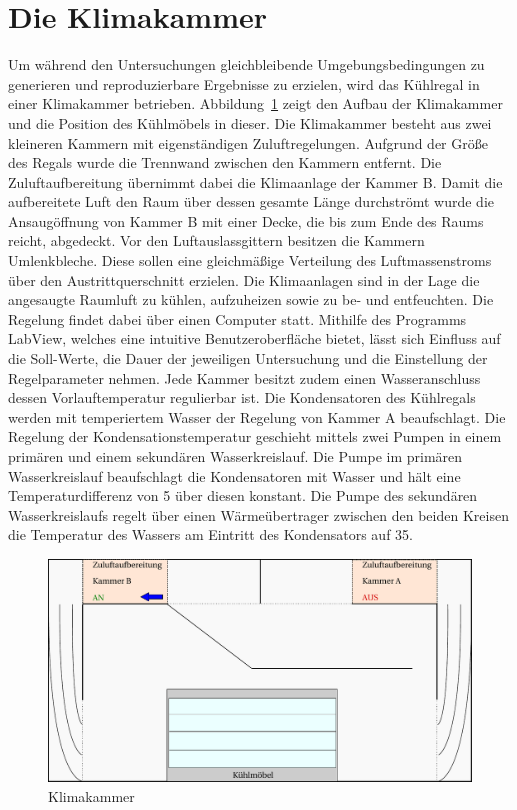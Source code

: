 \section{Die Klimakammer}
\label{sec:Die Klimakammer}

Um während den Untersuchungen gleichbleibende Umgebungsbedingungen zu generieren und  reproduzierbare Ergebnisse zu erzielen, wird das Kühlregal in einer Klimakammer betrieben.
Abbildung~\ref{fig:Klimakammer} zeigt den Aufbau der Klimakammer und die Position des Kühlmöbels in dieser.
Die Klimakammer besteht aus zwei kleineren Kammern mit eigenständigen Zuluftregelungen. Aufgrund der Größe des Regals wurde die Trennwand zwischen den Kammern entfernt. Die Zuluftaufbereitung übernimmt dabei die Klimaanlage der Kammer B. Damit die aufbereitete Luft den Raum über dessen gesamte Länge durchströmt wurde die Ansaugöffnung von Kammer B mit einer Decke, die bis zum Ende des Raums reicht, abgedeckt. Vor den Luftauslassgittern besitzen die Kammern Umlenkbleche. Diese sollen eine gleichmäßige Verteilung des Luftmassenstroms über den Austrittquerschnitt erzielen. Die Klimaanlagen sind in der Lage die angesaugte Raumluft zu kühlen, aufzuheizen sowie zu be- und entfeuchten. Die Regelung findet dabei über einen Computer statt. Mithilfe des Programms LabView, welches eine intuitive Benutzeroberfläche bietet, lässt sich Einfluss auf die Soll-Werte, die Dauer der jeweiligen Untersuchung und die Einstellung der Regelparameter nehmen. 
Jede Kammer besitzt zudem einen Wasseranschluss dessen Vorlauftemperatur regulierbar ist.
Die Kondensatoren des Kühlregals werden mit temperiertem Wasser der Regelung von Kammer A beaufschlagt. Die Regelung der Kondensationstemperatur geschieht mittels zwei Pumpen in einem primären und einem sekundären Wasserkreislauf. Die Pumpe im primären Wasserkreislauf beaufschlagt die Kondensatoren mit Wasser und hält eine Temperaturdifferenz von \unit{5}{\kelvin} über diesen konstant. Die Pumpe des sekundären Wasserkreislaufs regelt über einen Wärmeübertrager zwischen den beiden Kreisen die Temperatur des Wassers am Eintritt des Kondensators auf \unit{35}{\celsius}.


\begin{figure}[htb]
\centering
\includegraphics[scale=.6]{Pictures/ClimateChamber.pdf}
\caption{Klimakammer}
\label{fig:Klimakammer}
\end{figure}


